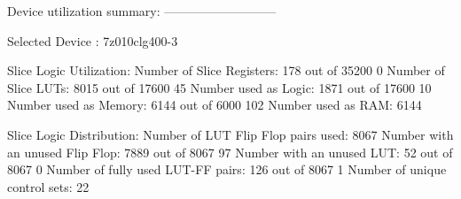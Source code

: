 \documentclass{article}
\begin{document}
\iffalse
Timing Summary:
---------------
Speed Grade: -2

   Minimum period: 3.949ns (Maximum Frequency: 253.233MHz)
   Minimum input arrival time before clock: 2.866ns
   Maximum output required time after clock: 2.895ns
   Maximum combinational path delay: 1.928ns
\fi

\iffalse
Device utilization summary:
---------------------------

Selected Device : 7z010clg400-3 


Slice Logic Utilization: 
 Number of Slice Registers:             178  out of  35200     0%
 Number of Slice LUTs:                 8012  out of  17600    45%
    Number used as Logic:              1868  out of  17600    10%
    Number used as Memory:             6144  out of   6000   102%
       Number used as RAM:             6144

Slice Logic Distribution: 
 Number of LUT Flip Flop pairs used:   8064
   Number with an unused Flip Flop:    7886  out of   8064    97%
   Number with an unused LUT:            52  out of   8064     0%
   Number of fully used LUT-FF pairs:   126  out of   8064     1%
   Number of unique control sets:        22

IO Utilization: 
 Number of IOs:                         171
 Number of bonded IOBs:                   0  out of    100     0%
\fi

\iffalse
Timing Summary:
---------------
Speed Grade: -3

   Minimum period: 3.253ns (Maximum Frequency: 307.390MHz)
   Minimum input arrival time before clock: 2.237ns
   Maximum output required time after clock: 2.247ns
   Maximum combinational path delay: 1.609ns
\fi

\iffalse
Device utilization summary:
---------------------------

Selected Device : 7z010clg400-3 


Slice Logic Utilization: 
 Number of Slice Registers:             178  out of  35200     0%
 Number of Slice LUTs:                 8015  out of  17600    45%
    Number used as Logic:              1871  out of  17600    10%
    Number used as Memory:             6144  out of   6000   102%
       Number used as RAM:             6144

Slice Logic Distribution: 
 Number of LUT Flip Flop pairs used:   8067
   Number with an unused Flip Flop:    7889  out of   8067    97%
   Number with an unused LUT:            52  out of   8067     0%
   Number of fully used LUT-FF pairs:   126  out of   8067     1%
   Number of unique control sets:        22
\end{document}
